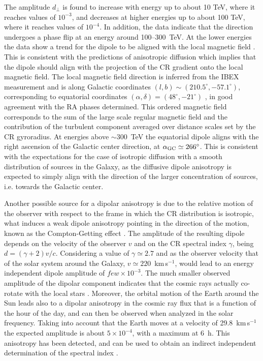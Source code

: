 \documentclass[twoside,12pt]{article}
\begin{document}
The amplitude $d_\perp$ is found to increase with energy up to about 10 TeV, where it reaches values of $10^{-3}$, and decreases at higher energies up to about 100 TeV, where it reaches values of $10^{-4}$. In addition, the data indicate that the direction undergoes a phase flip at an energy around 100--300~TeV. At the lower energies the data show a trend for the dipole to be aligned with the local magnetic field \cite{ah16}. This is consistent with the predictions  of anisotropic diffusion which implies that the dipole should align with the projection of the CR gradient onto the local magnetic field. The local magnetic field direction is inferred from the IBEX measurement and is along Galactic coordinates $(l,b)\sim (210.5^\circ,-57.1^\circ)$, corresponding to  equatorial coordinates $(\alpha,\delta)=(48^\circ,-21^\circ)$ \cite{ibex}, in good agreement with the RA phases determined. This ordered magnetic field corresponds to the sum of the large scale regular magnetic field and the contribution of the turbulent component averaged over distance scales set by the CR gyroradius. At energies above $\sim 300$~TeV the equatorial dipole aligns with the right ascension of the Galactic center direction,  at $\alpha_{\rm GC} \simeq 266^\circ$. This is consistent with the expectations for the case of isotropic diffusion with a smooth distribution of sources in the Galaxy, as the diffusive dipole anisotropy  is expected to simply align with the direction of the larger concentration of sources, i.e. towards the Galactic center.

Another possible source for a dipolar anisotropy is due to the relative motion of the observer with respect to the frame in which the CR distribution is isotropic, what induces a weak dipole anisotropy pointing in the direction of the motion, known as the Compton-Getting effect \cite{CG}. The amplitude of the resulting dipole depends on the velocity of the observer $v$ and on the CR spectral index $\gamma$, being  $d=(\gamma+2)v/c$. Considering a value of $\gamma \simeq 2.7$ and as the observer velocity that of the solar system around the Galaxy, $v \simeq 220$~km\,s$^{-1}$, would lead to an energy independent  dipole amplitude of $few \times 10^{-3}$. The much smaller observed amplitude of the dipolar component indicates that the  cosmic rays actually co-rotate with the local stars \cite{ti06}. Moreover, the orbital motion of the Earth around the Sun leads also to a dipolar anisotropy in the cosmic ray flux  that is a function of the hour of the day, and can then be observed when analyzed in the solar frequency. Taking into account that the Earth moves at a velocity of 29.8~km\,s$^{-1}$ the expected amplitude is about $5 \times 10^{-4}$, with a maximum at 6~h. This anisotropy has been detected, and can be used to obtain an indirect independent determination of the spectral index \cite{ti08}.
\end{document}
